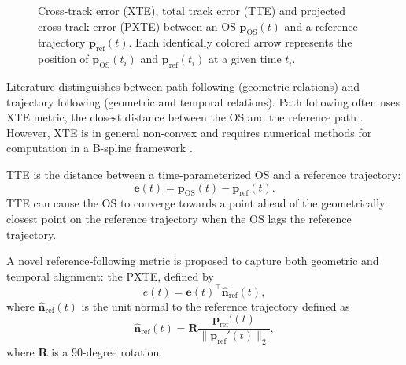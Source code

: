 \begin{figure}
    \centering
    
    \caption{Cross-track error (XTE), total track error (TTE) and projected cross-track error (PXTE) between an OS $\mathbf p_\text{OS}(t)$ and a reference trajectory $\mathbf p_\text{ref}(t)$. Each identically colored arrow represents the position of $\mathbf p_\text{OS}(t_i)$ and $\mathbf p_\text{ref}(t_i)$ at a given time $t_i$.}
    \label{fig:cross-track-along-track-error}
\end{figure}

Literature distinguishes between path following (geometric relations) and trajectory following (geometric and temporal relations). Path following often uses \acrfull{XTE} metric, the closest distance between the OS and the reference path \citep{Fossen2011-Handbook}. However, XTE is in general non-convex and requires numerical methods for computation in a B-spline framework \citep{johnson2005distance,hu2005second,chen2009computing}.

\acrfull{TTE} is the distance between a time-parameterized OS and a reference trajectory:
\begin{equation}\label{eq:total-track-error}
    \mathbf e(t) = \mathbf p_\text{OS}(t) - \mathbf p_\text{ref}(t).
\end{equation}
TTE can cause the OS to converge towards a point ahead of the geometrically closest point on the reference trajectory when the OS lags the reference trajectory.

A novel reference‐following metric is proposed to capture both geometric and temporal alignment: the \acrfull{PXTE}, defined by
\begin{equation}\label{eq:pxte}
  \bar e(t)
  = \mathbf e(t)^\top \mathbf{\hat n}_{\mathrm{ref}}(t),
\end{equation}
where $\mathbf{\hat n}_{\mathrm{ref}}(t)$ is the unit normal to the reference trajectory defined as 
\begin{equation}\label{eq:reference-normal-2}
    \mathbf{\hat n}_{\mathrm{ref}}(t) = \mathbf R\frac{\mathbf p_\text{ref}'(t)}{\|\mathbf p_\text{ref}'(t)\|_2},
\end{equation}
where $\mathbf R$ is a 90-degree rotation. 

